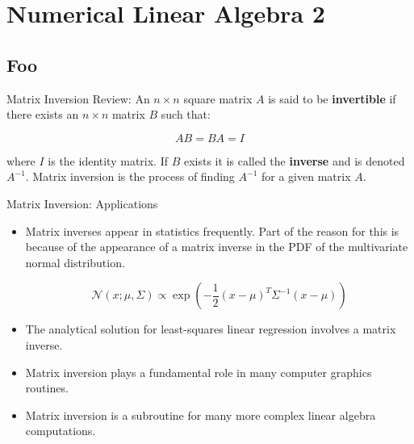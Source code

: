 \documentclass[serif,xcolor=pdftex,dvipsnames,table,hyperref={bookmarks=false,breaklinks}]{beamer}
\begin{document}
\maketitlepage

%
%

\section{Numerical Linear Algebra 2}
\subsection{Foo}

\begin{frame}[t]{Matrix Inversion}
	Review: An $n\times n$ square matrix $A$ is said to be \textbf{invertible} if there exists an $n \times n$ matrix $B$ such that:
	
	$$ AB = BA = I$$
	
	where $I$ is the identity matrix. If $B$ exists it is called the \textbf{inverse} and is denoted $A^{-1}$. Matrix inversion is the process of finding $A^{-1}$ for a given matrix $A$.
\end{frame}
	
\begin{frame}[t]{Matrix Inversion: Applications}
	\begin{itemize}[<+->]
		\item Matrix inverses appear in statistics frequently. Part of the reason for this is because of the appearance of a matrix inverse in the PDF of the multivariate normal distribution. 
		
		$$ \mathcal{N}(x;\mu,\Sigma) \propto \exp\left(-\frac{1}{2}(x-\mu)^T \Sigma^{-1}(x - \mu)\right) $$
		\item The analytical solution for least-squares linear regression involves a matrix inverse.
		\item Matrix inversion plays a fundamental role in many computer graphics routines.
		\item Matrix inversion is a subroutine for many more complex linear algebra computations.
	\end{itemize}
\end{frame}
\end{document}
